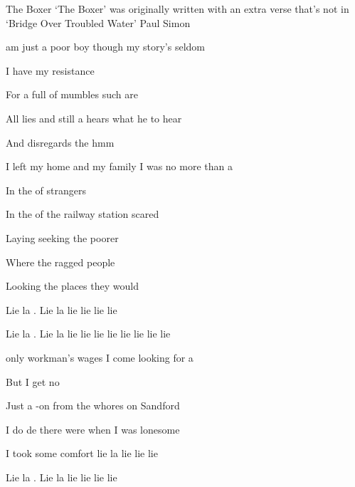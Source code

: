 \begin{SBSong}{The Boxer}
  {`The Boxer' was originally written with an extra verse that's not in `Bridge Over Troubled Water'}
  {Paul Simon}
  \begin{SBVerse}  
     am just a poor boy though my story's seldom  
    
    I have  my resistance 
    
    For a  full of mumbles such are  
    
    All lies and  still a  hears what he  to hear 
    
    And disregards the  hmm  
  \end{SBVerse}
  \WBPageBrk
  \begin{SBVerse}
     I left my home and my family I was no more than a  
    
    In the  of strangers 
    
    In the  of the railway station  scared
 
    Laying  seeking  the poorer 
 
    Where the ragged people  
    
    Looking  the places  they would  
  \end{SBVerse}
  \begin{SBChorus}
    Lie la . Lie la  lie lie lie lie
    
    Lie la . Lie la  lie lie lie lie lie lie lie lie  
  \end{SBChorus}
  \begin{SBVerse}
     only workman's wages I come looking for a 
    
    But I get no  
    
    Just a -on from the whores on Sandford 
 
    I do de there were  when I was  lonesome 
    
    I took some comfort  lie la  lie lie lie 
  \end{SBVerse}
  \begin{SBChorus}
    Lie la . Lie la  lie lie lie lie
    

\end{SBChorus}
\end{SBSong}
